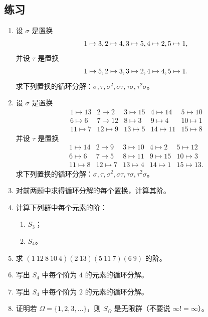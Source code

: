 \subsection*{练习}
\begin{enumerate}[label=\arabic*.]
  \item 设 $\sigma$ 是置换
  \[
  1\mapsto3,\\ 2\mapsto4,\\ 3\mapsto5,\\ 4\mapsto2,\\ 5\mapsto1,
  \]
  并设 $\tau$ 是置换
  \[
  1\mapsto5,\\ 2\mapsto3,\\ 3\mapsto2,\\ 4\mapsto4,\\ 5\mapsto1.
  \]
  求下列置换的循环分解：$\sigma,\tau,\sigma^2,\sigma\tau,\tau\sigma,\tau^2\sigma$。
  \item 设 $\sigma$ 是置换
  \[
  \begin{array}{ccccc}
  1\mapsto13&2\mapsto2&3\mapsto15&4\mapsto14&5\mapsto10\\
  6\mapsto6&7\mapsto12&8\mapsto3&9\mapsto4&10\mapsto1\\
  11\mapsto7&12\mapsto9&13\mapsto5&14\mapsto11&15\mapsto8
  \end{array}
  \]
  并设 $\tau$ 是置换
  \[
  \begin{array}{ccccc}
  1\mapsto14&2\mapsto9&3\mapsto10&4\mapsto2&5\mapsto12\\
  6\mapsto6&7\mapsto5&8\mapsto11&9\mapsto15&10\mapsto3\\
  11\mapsto8&12\mapsto7&13\mapsto4&14\mapsto1&15\mapsto13.
  \end{array}
  \]
  求下列置换的循环分解：$\sigma,\tau,\sigma^2,\sigma\tau,\tau\sigma,\tau^2\sigma$。
  \item 对前两题中求得循环分解的每个置换，计算其阶。
  \item 计算下列群中每个元素的阶：\begin{enumerate}[label=(\alph*)]
    \item $S_3$；\quad \item $S_4$。
  \end{enumerate}
  \item 求 $(1\ 12\ 8\ 10\ 4)(2\ 13)(5\ 11\ 7)(6\ 9)$ 的阶。
  \item 写出 $S_4$ 中每个阶为 $4$ 的元素的循环分解。
  \item 写出 $S_4$ 中每个阶为 $2$ 的元素的循环分解。
  \item 证明若 $\Omega=\{1,2,3,\ldots\}$，则 $S_\Omega$ 是无限群（不要说 $\infty!=\infty$）。

\end{enumerate}
